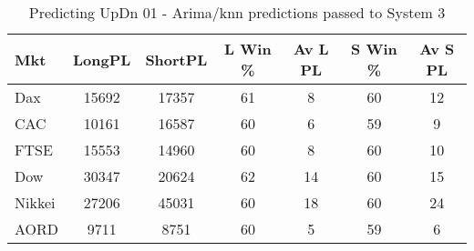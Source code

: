 \begin{table}[ht]
\centering
\caption[Predicting UpDn 01 - Arima/knn predictions passed to System 3.]{Predicting UpDn 01 - Arima/knn predictions passed to System 3} 
\label{tab:chp_ts:pUD_01_arima_knn_sys}
\begin{tabular}{lcccccc}
  \toprule Mkt & LongPL & ShortPL & L Win \% & Av L PL & S Win \% & Av S PL \\ 
  \midrule Dax & 15692 & 17357 & 61 & 8 & 60 & 12 \\ 
  CAC & 10161 & 16587 & 60 & 6 & 59 & 9 \\ 
  FTSE & 15553 & 14960 & 60 & 8 & 60 & 10 \\ 
  Dow & 30347 & 20624 & 62 & 14 & 60 & 15 \\ 
  Nikkei & 27206 & 45031 & 60 & 18 & 60 & 24 \\ 
  AORD & 9711 & 8751 & 60 & 5 & 59 & 6 \\ 
   \bottomrule \end{tabular}
\end{table}
